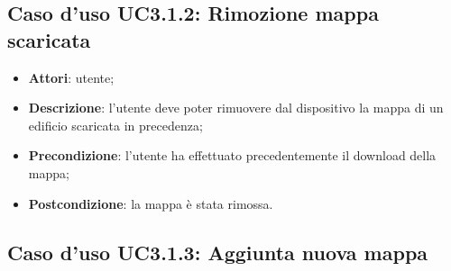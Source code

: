\documentclass[../AnalisiDeiRequisiti.tex]{subfiles}
\begin{document}
\subsection{Caso d'uso UC3.1.2: Rimozione mappa scaricata}
\begin{itemize}
\item \textbf{Attori}: utente;
\item \textbf{Descrizione}: l'utente deve poter rimuovere dal dispositivo la mappa di un edificio scaricata in precedenza; 
      \item \textbf{Precondizione}: l'utente ha effettuato precedentemente il download della mappa;
    \item \textbf{Postcondizione}: la mappa è stata rimossa.
  \end{itemize}

\hypertarget{UC3.1.3}{}
\subsection{Caso d'uso UC3.1.3: Aggiunta nuova mappa}
\end{document}
